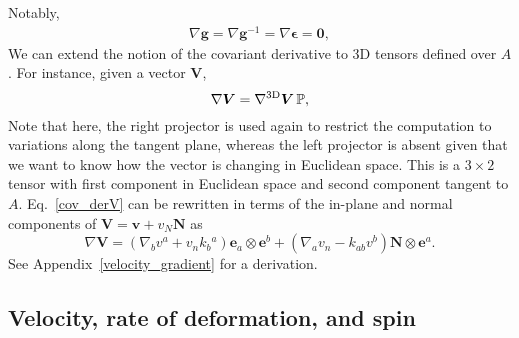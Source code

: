 Notably, 
\begin{align} \label{10_II}
	\nabla\bm{g} = \nabla\bm{g}^{-1} = \nabla\bm{\epsilon} = \bm{0},
\end{align}
We can extend the notion of the covariant derivative to 3D tensors defined over $A$. For instance, given a vector $\bm{V}$,
\begin{equation}\label{cov_derV}
	\nabla \bm{V} = \nabla^{\rm 3D} \bm{V}\,\mathbb{P},
\end{equation}
Note that here, the right projector is used again to restrict the computation to variations along the tangent plane, whereas the left projector is absent given that we want to know how the vector is changing in Euclidean space. This is a $3\times2$ tensor with first component in Euclidean space and second component tangent to $A$. Eq.~\eqref{cov_derV} can be rewritten in terms of the in-plane  and normal components of $\bm{V} = \bm{v} + v_N \bm{N}$ as
\begin{equation}
	\label{eq::velgrad}
	\nabla \bm{V}= \left(\nabla_b v^a+v_n k_b{}^a \right) \bm{e}_a \otimes \bm{e}^b + \left(\nabla_a v_n - k_{ab} v^b \right) \bm{N} \otimes \bm{e}^a.
\end{equation}
See Appendix~\ref{velocity_gradient} for a derivation. 

\subsection{Velocity, rate of deformation, and spin}

